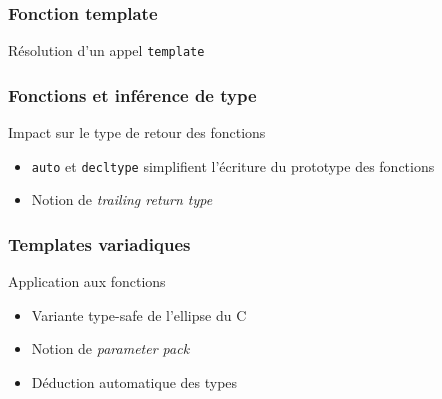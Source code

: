 \documentclass[svgnames]{beamer}
\begin{document}
\frame
{
  \frametitle{Fonction template}
  \begin{block}{Résolution d'un appel \texttt{template}}
  \bigskip
  \lsttmpreturn
  \end{block}
}

\frame
{
  \frametitle{Fonctions et inférence de type}
  \begin{block}{Impact sur le type de retour des fonctions}
  \begin{itemize}
  \item \texttt{auto} et \texttt{decltype} simplifient l'écriture
  du prototype des fonctions
  \item Notion de \textit{trailing return type}
  \end{itemize}

  \end{block}
}

\frame
{
  \frametitle{Templates variadiques}
  \begin{block}{Application aux fonctions}
  \begin{itemize}
  \item Variante type-safe de l'ellipse  du C
  \item Notion de \textit{parameter pack}
  \item Déduction automatique des types
  \end{itemize}

  \begin{overlayarea}{\textwidth}{4cm}
  \end{overlayarea}
  \end{block}
}
\end{document}
